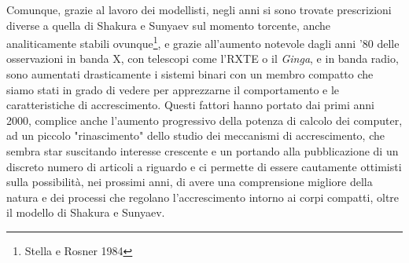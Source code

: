 \documentclass[a4paperbi]{article}
\begin{document}
	Comunque, grazie al lavoro dei modellisti, negli anni si sono trovate prescrizioni diverse a quella di Shakura e Sunyaev sul momento torcente, anche analiticamente stabili ovunque\footnote{Stella e Rosner 1984}, e grazie all'aumento notevole dagli anni '80 delle osservazioni in banda X, con telescopi come l'RXTE o il \textit{Ginga}, e in banda radio, sono aumentati drasticamente i sistemi binari con un membro compatto che siamo stati in grado di vedere per apprezzarne il comportamento e le caratteristiche di accrescimento. 
	Questi fattori hanno portato dai primi anni 2000, complice anche l'aumento progressivo della potenza di calcolo dei computer, ad un piccolo "rinascimento" dello studio dei meccanismi di accrescimento, che sembra star suscitando interesse crescente e un portando alla pubblicazione di un discreto numero di articoli a riguardo e ci permette di essere cautamente ottimisti sulla possibilità, nei prossimi anni, di avere una comprensione migliore della natura e dei processi che regolano l'accrescimento intorno ai corpi compatti, oltre il modello di Shakura e Sunyaev.
	
\end{document}
